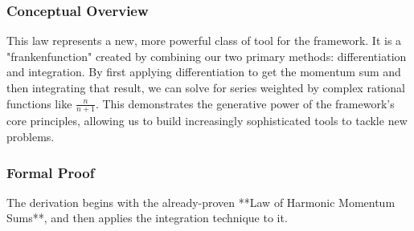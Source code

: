 \subsubsection*{Conceptual Overview}
This law represents a new, more powerful class of tool for the framework. It is a "frankenfunction" created by combining our two primary methods: differentiation and integration. By first applying differentiation to get the momentum sum and then integrating that result, we can solve for series weighted by complex rational functions like $\frac{n}{n+1}$. This demonstrates the generative power of the framework's core principles, allowing us to build increasingly sophisticated tools to tackle new problems.

\subsubsection*{Formal Proof}
The derivation begins with the already-proven **Law of Harmonic Momentum Sums**, and then applies the integration technique to it.

